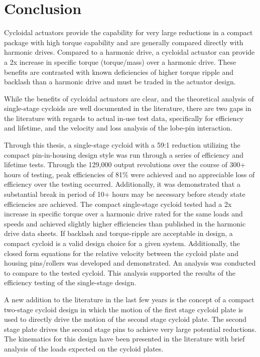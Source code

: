 
\chapter{Conclusion}\label{ch:conclusion}

Cycloidal actuators provide the capability for very large reductions in a compact package with high torque capability and are generally compared directly with harmonic drives. Compared to a harmonic drive, a cycloidal actuator can provide a 2x increase in specific torque (torque/mass) over a harmonic drive. These benefits are contrasted with known deficiencies of higher torque ripple and backlash than a harmonic drive and must be traded in the actuator design. 

While the benefits of cycloidal actuators are clear, and the theoretical analysis of single-stage cycloids are well documented in the literature, there are two gaps in the literature with regards to actual in-use test data, specifically for efficiency and lifetime, and the velocity and loss analysis of the lobe-pin interaction. 

Through this thesis, a single-stage cycloid with a 59:1 reduction utilizing the compact pin-in-housing design style was run through a series of efficiency and lifetime tests. Through the 129,000 output revolutions over the course of 300+ hours of testing, peak efficiencies of 81\% were achieved and no appreciable loss of efficiency over the testing occurred. Additionally, it was demonstrated that a substantial break in period of 10+ hours may be necessary before steady state efficiencies are achieved. The compact single-stage cycloid tested had a 2x increase in specific torque over a harmonic drive rated for the same loads and speeds and achieved slightly higher efficiencies than published in the harmonic drive data sheets. If backlash and torque-ripple are acceptable in design, a compact cycloid is a valid design choice for a given system. Additionally, the closed form equations for the relative velocity between the cycloid plate and housing pins/rollers was developed and demonstrated. An analysis was conducted to compare to the tested cycloid. This analysis supported the results of the efficiency testing of the single-stage design.

A new addition to the literature in the last few years is the concept of a compact two-stage cycloid design in which the motion of the first stage cycloid plate is used to directly drive the motion of the second stage cycloid plate. The second stage plate drives the second stage pins to achieve very large potential reductions. The kinematics for this design have been presented in the literature with brief analysis of the loads expected on the cycloid plates. 

